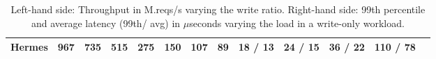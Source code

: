 \begin{table}[t]
{\begin{tabular}{c|c|c|c|c|c|c|c|||c|c|c|c|c|}
\multicolumn{1}{|c|}{ Hermes} &
967 &	735 &	515 &	275 &	150 &	107 &	89 
& 18 / 13 & 
24 / 15 & 
36 / 22 & 
110 / 78 
 \\ \hline 


\end{tabular}%
 }
\caption{Left-hand side: Throughput in M.reqs/s varying the write ratio. Right-hand side: 99th percentile and average latency (99th/ avg) in $\mu$seconds varying the load in a write-only workload.}
\vspace{-1.5em}
\label{tab:all-perf}
\end{table}
















